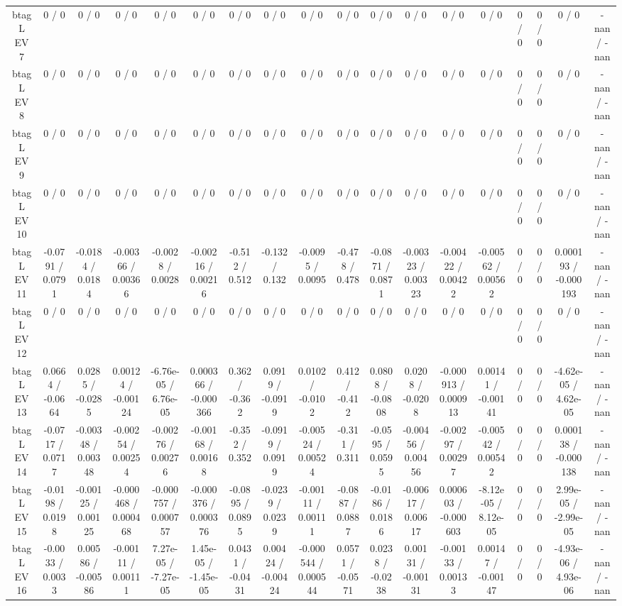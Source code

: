 \documentclass[10pt]{article}
\begin{document}
\begin{table}[htbp]
\begin{center}
\begin{tabular}{|c|c|c|c|c|c|c|c|c|c|c|c|c|c|c|c|c|c|}
  btag L EV 7 & 0 / 0 & 0 / 0 & 0 / 0 & 0 / 0 & 0 / 0 & 0 / 0 & 0 / 0 & 0 / 0 & 0 / 0 & 0 / 0 & 0 / 0 & 0 / 0 & 0 / 0 & 0 / 0 & 0 / 0 & 0 / 0 & -nan / -nan \\ 
  btag L EV 8 & 0 / 0 & 0 / 0 & 0 / 0 & 0 / 0 & 0 / 0 & 0 / 0 & 0 / 0 & 0 / 0 & 0 / 0 & 0 / 0 & 0 / 0 & 0 / 0 & 0 / 0 & 0 / 0 & 0 / 0 & 0 / 0 & -nan / -nan \\ 
  btag L EV 9 & 0 / 0 & 0 / 0 & 0 / 0 & 0 / 0 & 0 / 0 & 0 / 0 & 0 / 0 & 0 / 0 & 0 / 0 & 0 / 0 & 0 / 0 & 0 / 0 & 0 / 0 & 0 / 0 & 0 / 0 & 0 / 0 & -nan / -nan \\ 
  btag L EV 10 & 0 / 0 & 0 / 0 & 0 / 0 & 0 / 0 & 0 / 0 & 0 / 0 & 0 / 0 & 0 / 0 & 0 / 0 & 0 / 0 & 0 / 0 & 0 / 0 & 0 / 0 & 0 / 0 & 0 / 0 & 0 / 0 & -nan / -nan \\ 
  btag L EV 11 & -0.0791 / 0.0791 & -0.0184 / 0.0184 & -0.00366 / 0.00366 & -0.0028 / 0.0028 & -0.00216 / 0.00216 & -0.512 / 0.512 & -0.132 / 0.132 & -0.0095 / 0.0095 & -0.478 / 0.478 & -0.0871 / 0.0871 & -0.00323 / 0.00323 & -0.00422 / 0.00422 & -0.00562 / 0.00562 & 0 / 0 & 0 / 0 & 0.000193 / -0.000193 & -nan / -nan \\ 
  btag L EV 12 & 0 / 0 & 0 / 0 & 0 / 0 & 0 / 0 & 0 / 0 & 0 / 0 & 0 / 0 & 0 / 0 & 0 / 0 & 0 / 0 & 0 / 0 & 0 / 0 & 0 / 0 & 0 / 0 & 0 / 0 & 0 / 0 & -nan / -nan \\ 
  btag L EV 13 & 0.0664 / -0.0664 & 0.0285 / -0.0285 & 0.00124 / -0.00124 & -6.76e-05 / 6.76e-05 & 0.000366 / -0.000366 & 0.362 / -0.362 & 0.0919 / -0.0919 & 0.0102 / -0.0102 & 0.412 / -0.412 & 0.0808 / -0.0808 & 0.0208 / -0.0208 & -0.000913 / 0.000913 & 0.00141 / -0.00141 & 0 / 0 & 0 / 0 & -4.62e-05 / 4.62e-05 & -nan / -nan \\ 
  btag L EV 14 & -0.0717 / 0.0717 & -0.00348 / 0.00348 & -0.00254 / 0.00254 & -0.00276 / 0.00276 & -0.00168 / 0.00168 & -0.352 / 0.352 & -0.0919 / 0.0919 & -0.00524 / 0.00524 & -0.311 / 0.311 & -0.0595 / 0.0595 & -0.00456 / 0.00456 & -0.00297 / 0.00297 & -0.00542 / 0.00542 & 0 / 0 & 0 / 0 & 0.000138 / -0.000138 & -nan / -nan \\ 
  btag L EV 15 & -0.0198 / 0.0198 & -0.00125 / 0.00125 & -0.000468 / 0.000468 & -0.000757 / 0.000757 & -0.000376 / 0.000376 & -0.0895 / 0.0895 & -0.0239 / 0.0239 & -0.00111 / 0.00111 & -0.0887 / 0.0887 & -0.0186 / 0.0186 & -0.00617 / 0.00617 & 0.000603 / -0.000603 & -8.12e-05 / 8.12e-05 & 0 / 0 & 0 / 0 & 2.99e-05 / -2.99e-05 & -nan / -nan \\ 
  btag L EV 16 & -0.0033 / 0.0033 & 0.00586 / -0.00586 & -0.00111 / 0.00111 & 7.27e-05 / -7.27e-05 & 1.45e-05 / -1.45e-05 & 0.0431 / -0.0431 & 0.00424 / -0.00424 & -0.000544 / 0.000544 & 0.0571 / -0.0571 & 0.0238 / -0.0238 & 0.00131 / -0.00131 & -0.00133 / 0.00133 & 0.00147 / -0.00147 & 0 / 0 & 0 / 0 & -4.93e-06 / 4.93e-06 & -nan / -nan \\ 

\end{tabular}
\end{center}
\end{table}
\end{document}
